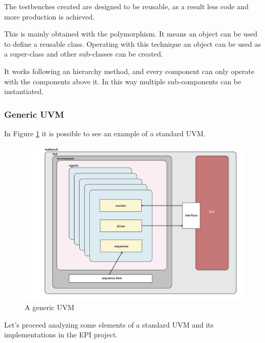 The testbenches created are designed to be reusable, as a result less code and more production is achieved.

This is mainly obtained with the polymorphism. It means an object can be used to define a reusable class. Operating with this technique an object can be used as a super-class and other sub-classes can be created.

It works following an hierarchy method, and every component can only operate with the components above it. In this way multiple sub-components can be instantiated.

\subsubsection{Generic UVM}
In Figure \ref{gen-uvm} it is possible to see an example of a standard UVM.

\begin{figure}[H]
    \centering
    \includegraphics[scale = 0.4]{Chapter_1/img/general-uvm.png}
    \caption{A generic UVM}
    \label{gen-uvm}
\end{figure}

Let's proceed analyzing some elements of a standard UVM and its implementations in the EPI project.

